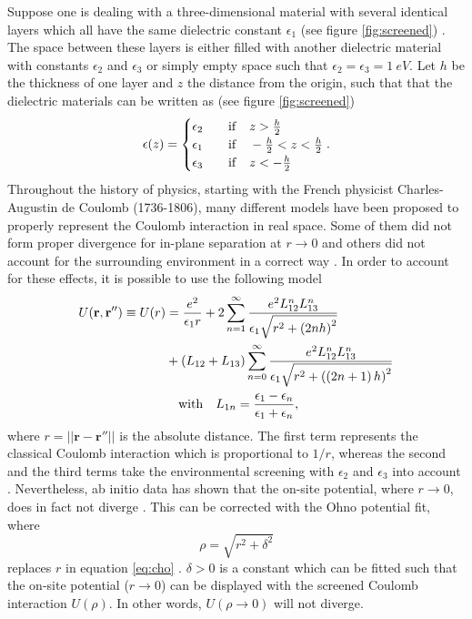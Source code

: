Suppose one is dealing with a three-dimensional material with several identical layers which all have the same dielectric constant $\epsilon_1$ (see figure \ref{fig:screened}) \cite{Roesner2015}. The space between these layers is either filled with another dielectric material with constants $\epsilon_2$ and $\epsilon_3$ or simply empty space such that $\epsilon_2=\epsilon_3=\SI{1}{eV}$. Let $h$ be the thickness of one layer and $z$ the distance from the origin, such that that the dielectric materials can be written as (see figure \ref{fig:screened})
\begin{equation}
    \epsilon(z)=\begin{cases}\epsilon_2 &\quad \mathrm{if} \quad z>\frac{h}{2}\\
    \epsilon_1 &\quad \mathrm{if} \quad -\frac{h}{2}<z<\frac{h}{2}\\
    \epsilon_3 &\quad \mathrm{if} \quad z<-\frac{h}{2}
    \end{cases}.
\end{equation}
Throughout the history of physics, starting with the French physicist Charles-Augustin de Coulomb (1736-1806), many different models have been proposed to properly represent the Coulomb interaction in real space. Some of them did not form proper divergence for in-plane separation at $r\to 0$ and others did not account for the surrounding environment in a correct way \cite{Cho2018}. In order to account for these effects, it is possible to use the following model \cite{Cho2018}
\begin{equation}\label{eq:cho}
\begin{split}
    U(\mathbf{r},\mathbf{r}'') \equiv U(r)&= \frac{e^2}{\epsilon_1 r} + 2\sum_{n=1}^\infty\frac{e^2L_{12}^nL^n_{13}}{\epsilon_1\sqrt{r^2+\left(2nh\right)^2}}\\
    &+ \left(L_{12}+L_{13}\right)\sum_{n=0}^\infty\frac{e^2L^n_{12}L^n_{13}}{\epsilon_1\sqrt{r^2+\left(\left(2n+1\right)h\right)^2}}\\
    &\quad \mathrm{with} \quad L_{1n}=\frac{\epsilon_1-\epsilon_n}{\epsilon_1+\epsilon_n},
\end{split}
\end{equation}
where $r=||\mathbf{r}-\mathbf{r}''||$ is the absolute distance. The first term represents the classical Coulomb interaction which is proportional to $1/r$, whereas the second and the third terms take the environmental screening with $\epsilon_2$ and $\epsilon_3$ into account \cite{Cho2018}. Nevertheless, ab initio data has shown that the on-site potential, where $r\to 0$, does in fact not diverge \cite{Goodwin2019}. This can be corrected with the Ohno potential fit, where 
\begin{equation}
    \rho = \sqrt{r^2+\delta^2}
\end{equation}
replaces $r$ in equation \ref{eq:cho} \cite{Goodwin2019}. $\delta>0$ is a constant which can be fitted such that the on-site potential ($r\to 0$) can be displayed with the screened Coulomb interaction $U(\rho)$. In other words, $U(\rho \to 0)$ will not diverge.

